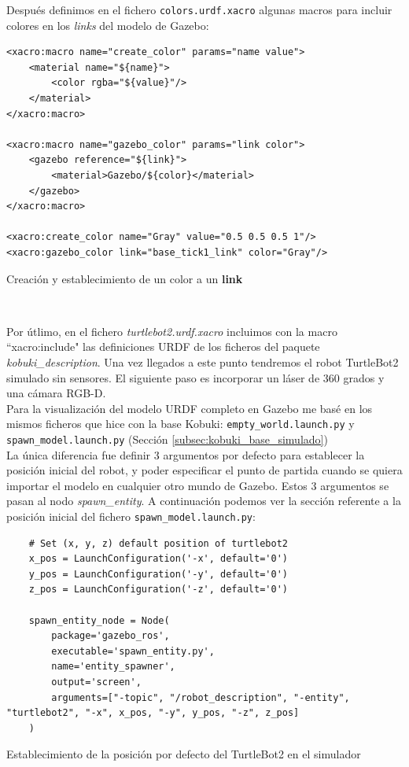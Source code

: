 Después definimos en el fichero \texttt{colors.urdf.xacro} algunas macros para incluir colores en los \textit{links} del modelo de Gazebo:\\
\begin{code}[H]
\begin{lstlisting}
<xacro:macro name="create_color" params="name value">
	<material name="${name}">
		<color rgba="${value}"/>
	</material>
</xacro:macro>

<xacro:macro name="gazebo_color" params="link color">
	<gazebo reference="${link}">
		<material>Gazebo/${color}</material>
	</gazebo>
</xacro:macro>

<xacro:create_color name="Gray" value="0.5 0.5 0.5 1"/>
<xacro:gazebo_color link="base_tick1_link" color="Gray"/>
\end{lstlisting}
\caption{Creación y establecimiento de un color a un \textbf{link}}
\label{fig:creacion_color_link}
\end{code}\

Por útlimo, en el fichero \textit{turtlebot2.urdf.xacro} incluimos con la macro ``xacro:include" las definiciones URDF de los ficheros del paquete \textit{kobuki\_description}. Una vez llegados a este punto tendremos el robot TurtleBot2 simulado sin sensores. El siguiente paso es incorporar un láser de 360 grados y una cámara RGB-D.\\

Para la visualización del modelo URDF completo en Gazebo me basé en los mismos ficheros que hice con la base Kobuki: \texttt{empty\_world.launch.py} y \texttt{spawn\_model.launch.py} (Sección \ref{subsec:kobuki_base_simulado})\\

La única diferencia fue definir 3 argumentos por defecto para establecer la posición inicial del robot, y poder especificar el punto de partida cuando se quiera importar el modelo en cualquier otro mundo de Gazebo. Estos 3 argumentos se pasan al nodo \textit{spawn\_entity}. A continuación podemos ver la sección referente a la posición inicial del fichero \texttt{spawn\_model.launch.py}:\\

\begin{code}[H]
\begin{lstlisting}
	# Set (x, y, z) default position of turtlebot2
	x_pos = LaunchConfiguration('-x', default='0')
	y_pos = LaunchConfiguration('-y', default='0')
	z_pos = LaunchConfiguration('-z', default='0')
	
	spawn_entity_node = Node(
		package='gazebo_ros',
		executable='spawn_entity.py',
		name='entity_spawner',
		output='screen',
		arguments=["-topic", "/robot_description", "-entity", "turtlebot2", "-x", x_pos, "-y", y_pos, "-z", z_pos]
	)
\end{lstlisting}
\caption{Establecimiento de la posición por defecto del TurtleBot2 en el simulador}
\label{cod:posicion_defecto_turtlebot2_simulador}
\end{code}\

